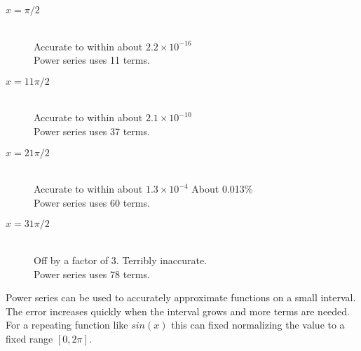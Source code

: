 \documentclass[12pt]{article}
\begin{document}
\begin{description}
	\item[$x=\pi/2$] \hfill \\
	Accurate to within about $2.2 \times 10^{-16}$\\
	Power series uses 11 terms.
	\item[$x=11\pi/2$] \hfill \\
	Accurate to within about $2.1 \times 10^{-10}$\\
	Power series uses 37 terms.
	\item[$x=21\pi/2$] \hfill \\
	Accurate to within about $1.3 \times 10^{-4}$ About 0.013\%\\
	Power series uses 60 terms.
	\item[$x=31\pi/2$] \hfill \\
	Off by a factor of 3. Terribly inaccurate.\\
	Power series uses 78 terms.
\end{description}

Power series can be used to accurately approximate functions on a small interval. The error increases quickly when the interval grows and more terms are needed. For a repeating function like $sin(x)$ this can fixed normalizing the value to a fixed range $[0,2\pi]$.
\end{document}
